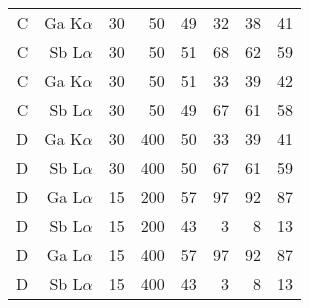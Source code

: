 \begin{table}[phtb]
\begin{center}
\begin{tabular}{rrrrrrrr}
            C               & Ga K$\alpha$  & 30             & 50             & 49                        & 32                     & 38                     & 41                     \\
            C               & Sb L$\alpha$  & 30             & 50             & 51                        & 68                     & 62                     & 59                     \\
            C               & Ga K$\alpha$  & 30             & 50             & 51                        & 33                     & 39                     & 42                     \\
            C               & Sb L$\alpha$  & 30             & 50             & 49                        & 67                     & 61                     & 58                     \\
            \hline
            D               & Ga K$\alpha$  & 30             & 400            & 50                        & 33                     & 39                     & 41                     \\
            D               & Sb L$\alpha$  & 30             & 400            & 50                        & 67                     & 61                     & 59                     \\
            D               & Ga L$\alpha$  & 15             & 200            & 57                        & 97                     & 92                     & 87                     \\
            D               & Sb L$\alpha$  & 15             & 200            & 43                        & 3                      & 8                      & 13                     \\
            D               & Ga L$\alpha$  & 15             & 400            & 57                        & 97                     & 92                     & 87                     \\
            D               & Sb L$\alpha$  & 15             & 400            & 43                        & 3                      & 8                      & 13                     \\
            \hline
        \end{tabular}
    \end{center}
\end{table}
